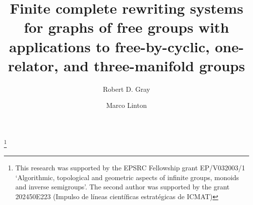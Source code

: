 \documentclass[12pt, a4paper]{amsart}
\theoremstyle{definition}
\begin{document}
\title[Complete rewriting systems for graphs of free groups]{
Finite complete rewriting systems for graphs of free groups with 
applications to free-by-cyclic, one-relator, and three-manifold groups}
\author[R.~D.~Gray]{Robert D. Gray}
\address{School of Engineering, Mathematics and Physics, University of East Anglia, Norwich NR4 7TJ, UK}

\author[M. Linton]{Marco Linton}
\address{Instituto de Ciencias Matem\'{a}ticas, CSIC-UAM-UC3M-UCM, Madrid, Spain}

\thanks{This research was supported by the EPSRC Fellowship grant EP/V032003/1 ‘Algorithmic, topological and geometric aspects of infinite groups, monoids and inverse semigroups’. The second author was supported by the grant 202450E223 (Impulso de líneas científicas estratégicas de ICMAT)}


\maketitle
\end{document}
